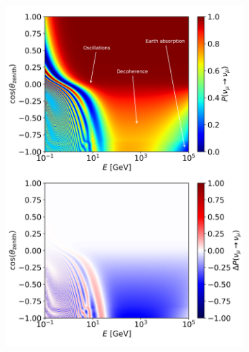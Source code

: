 \documentclass[a4paper,11pt]{article}
\begin{document}
\begin{figure}
    \begin{subfigure}[b]{0.5\textwidth}
    \centering
    \includegraphics[trim=0.0cm 12.7cm 0.cm 0.2cm, clip=true, width=\linewidth]{images/atmo_oscillogram_randomize_flavor_n0_matter.png}
    \caption{\label{fig:CryoDarkRate}}
    \end{subfigure}
    \begin{subfigure}[b]{0.5\textwidth}
    \centering

\end{subfigure}
\end{figure}
\end{document}

